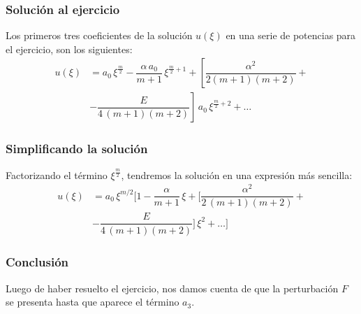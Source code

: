 \documentclass[12pt]{beamer}
\begin{document}
\begin{frame}
\frametitle{Solución al ejercicio}
\vspace*{-1cm}
Los primeros tres coeficientes de la solución $u(\xi)$ en una serie de potencias para el ejercicio, son los siguientes:
\pause
\begin{align*}
u(\xi) &= a_{0} \, \xi^{\frac{m}{2}} - \dfrac{\alpha \, a_{0}}{m + 1} \, \xi^{\frac{m}{2}+1} + \left[ \dfrac{\alpha^{2}}{2(m + 1)(m + 2)} + \right. \\[0.5em]
&- \left. \dfrac{E}{4 \, (m + 1)(m + 2)} \right] \, a_{0} \, \xi^{\frac{m}{2}+2} + \ldots
\end{align*}
\end{frame}
\begin{frame}
\frametitle{Simplificando la solución}
Factorizando el término $\xi^{\frac{m}{2}}$, tendremos la solución en una expresión más sencilla:
\begin{align*}
u(\xi) &= a_{0} \, \xi^{m/2}  \bigg[ 1 - \dfrac{\alpha}{m + 1} \, \xi + \bigg[ \dfrac{\alpha^{2}}{2 \, (m + 1)(m + 2)} + \\[0.5em]
&- \dfrac{E}{4 \, (m + 1)(m + 2)} \bigg] \, \xi^{2} + \ldots \bigg]
\end{align*}
\end{frame}
\begin{frame}
\frametitle{Conclusión}
Luego de haber resuelto el ejercicio, nos damos cuenta de que la perturbación $F$ se presenta hasta que aparece el término $a_{3}$.
\end{frame}
\end{document}
